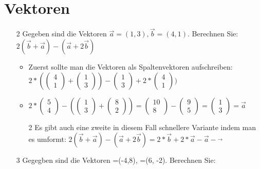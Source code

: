 \documentclass{article}
\begin{document}
	\section{Vektoren}
	\begin{itemize}
		\item[2]{Gegeben sind die Vektoren $\vec{a}=(1,3), \vec{b}=(4,1)$. Berechnen Sie: $2(\vec{b}+\vec{a})-(\vec{a}+2\vec{b})$}
		\begin{itemize}
			\item{Zuerst sollte man die Vektoren als Spaltenvektoren aufschreiben: $2*(\begin{pmatrix} 4 \\ 1 \end{pmatrix}+\begin{pmatrix} 1 \\ 3 \end{pmatrix})-\begin{pmatrix} 1 \\ 3 \end{pmatrix}+2*\begin{pmatrix} 4 \\ 1 \end{pmatrix})$}
			\item{$2*\begin{pmatrix} 5 \\ 4 \end{pmatrix}-(\begin{pmatrix} 1 \\ 3 \end{pmatrix}+\begin{pmatrix} 8 \\ 2 \end{pmatrix})=\begin{pmatrix} 10 \\ 8 \end{pmatrix}-\begin{pmatrix} 9 \\ 5 \end{pmatrix}=\begin{pmatrix} 1 \\ 3 \end{pmatrix}=\vec{a}$}
			\item[2]{Es gibt auch eine zweite in diesem Fall schnellere Variante indem man es umformt: $2(\vec{b}+\vec{a})-(\vec{a}+2 \vec{b})=2*\vec{b}+2*\vec{a}-\vec{a}-\vec{}$}
		\end{itemize}
		\item[3]{Gegegben sind die Vektoren =(-4,8), =(6, -2). Berechnen Sie:}

\end{itemize}
\end{document}
